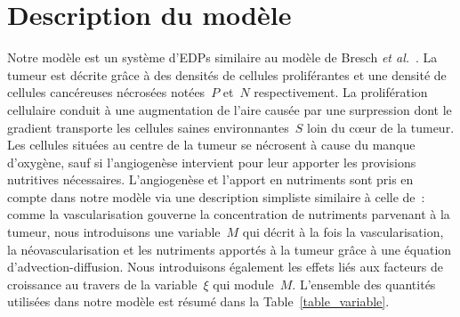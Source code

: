 \documentclass[main.tex]{subfiles}
\begin{document}
\section{Description du modèle}

Notre modèle est un système d'EDPs similaire au modèle de 
Bresch {\it et al.}~\cite{Bresch2010}. 
La tumeur est décrite grâce à des densités de cellules proliférantes et une densité de cellules cancéreuses nécrosées notées~$P$ et~$N$ respectivement. 
La prolifération cellulaire conduit à une augmentation de l'aire causée par une surpression dont le gradient transporte les cellules saines environnantes~$S$ loin du c\oe{}ur de la tumeur. 
Les cellules situées au centre de la tumeur se nécrosent à cause du manque d'oxygène, sauf si l'angiogenèse intervient pour leur apporter les provisions nutritives nécessaires.
L'angiogenèse et l'apport en nutriments sont pris en compte dans notre modèle via une description simpliste similaire à celle de~\cite{Fathallah2013,Billy2009545}: comme la vascularisation gouverne la concentration de nutriments parvenant à la tumeur, nous introduisons une variable~$M$ 
qui décrit à la fois la vascularisation, la néovascularisation et les nutriments apportés à la tumeur grâce à une équation d'advection-diffusion. 
Nous introduisons également les effets liés aux facteurs de croissance au travers de la variable~$\xi$ qui module~$M$. L'ensemble des quantités utilisées dans notre modèle est résumé dans la Table~\ref{table_variable}.
\end{document}
